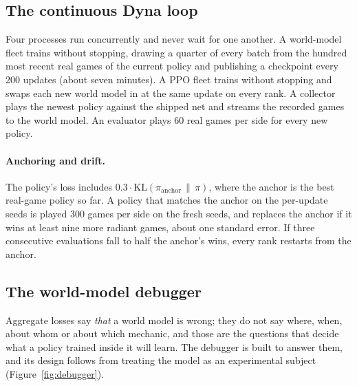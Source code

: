 \documentclass[11pt]{article}
\begin{document}
\subsection{The continuous Dyna loop}

Four processes run concurrently and never wait for one another. A world-model fleet trains without stopping, drawing a quarter of every batch from the hundred most recent real games of the current policy and publishing a checkpoint every 200 updates (about seven minutes). A PPO fleet trains without stopping and swaps each new world model in at the same update on every rank. A collector plays the newest policy against the shipped net and streams the recorded games to the world model. An evaluator plays 60 real games per side for every new policy.

\paragraph{Anchoring and drift.} The policy's loss includes $0.3\cdot\mathrm{KL}(\pi_{\text{anchor}}\,\|\,\pi)$, where the anchor is the best real-game policy so far. A policy that matches the anchor on the per-update seeds is played 300 games per side on the fresh seeds, and replaces the anchor if it wins at least nine more radiant games, about one standard error. If three consecutive evaluations fall to half the anchor's wins, every rank restarts from the anchor.

\subsection{The world-model debugger}
\label{sec:debugger}

Aggregate losses say \emph{that} a world model is wrong; they do not say where, when, about whom or about which mechanic, and those are the questions that decide what a policy trained inside it will learn. The debugger is built to answer them, and its design follows from treating the model as an experimental subject (Figure~\ref{fig:debugger}).
\end{document}

